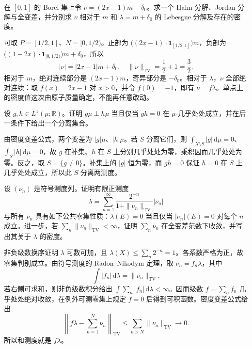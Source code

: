 \begin{exercise}\label{b1:ex:06-mixed-decompositions}
在 \([0,1]\) 的 Borel 集上令 \(\nu=(2x-1)m-\delta_0\)。求一个 Hahn 分解、Jordan 分解与全变差，并分别求 \(\nu\) 相对于 \(m\) 和 \(\lambda=m+\delta_0\) 的 Lebesgue 分解及存在的密度。
\end{exercise}
\begin{solution}
可取 \(P=[1/2,1]\)、\(N=[0,1/2)\)。正部为 \(\bigl((2x-1)\cdot\mathbf1_{[1/2,1]}\bigr)m\)，负部为 \(\bigl((1-2x)\cdot\mathbf1_{[0,1/2)}\bigr)m+\delta_0\)，所以
\[
|\nu|=|2x-1|m+\delta_0,\quad \|\nu\|_{\mathrm{TV}}=\frac12+1=\frac32.
\]
相对于 \(m\)，绝对连续部分是 \((2x-1)m\)，奇异部分是 \(-\delta_0\)。相对于 \(\lambda\)，\(\nu\) 全部绝对连续：取 \(f(x)=2x-1\) 对 \(x>0\)，并令 \(f(0)=-1\)，即有 \(\nu=f\lambda\)。单点上的密度值这次由原子质量确定，不能再任意改动。
\end{solution}

\begin{exercise}\label{b1:ex:06-density-singularity}
设 \(g,h\in L^1(\mu;\mathbb R)\)。证明 \(g\mu\perp h\mu\) 当且仅当 \(gh=0\) 在 \(\mu\)-几乎处处成立，并在后一条件下给出一个分离集合。
\end{exercise}
\begin{solution}
由密度变差公式，两个变差为 \(|g|\mu\)、\(|h|\mu\)。若 \(S\) 分离它们，则 \(\int_{X\setminus S}|g|\,\mathrm d\mu=0\)、\(\int_S|h|\,\mathrm d\mu=0\)，故 \(g\) 在补集、\(h\) 在 \(S\) 上分别几乎处处为零，乘积因而几乎处处为零。反之，取 \(S=\{g\neq0\}\)。补集上的 \(|g|\) 恒为零，而 \(gh=0\) 保证 \(h=0\) 在 \(S\) 上几乎处处成立，所以此 \(S\) 分离两测度。
\end{solution}

\begin{exercise}\label{b1:ex:06-common-control}
设 \((\nu_n)\) 是符号测度列。证明有限正测度
\[
\lambda=\sum_{n=1}^{\infty}\frac{2^{-n}}{1+\|\nu_n\|_{\mathrm{TV}}}|\nu_n|
\]
与所有 \(\nu_n\) 具有如下公共零集性质：\(\lambda(E)=0\) 当且仅当 \(|\nu_n|(E)=0\) 对每个 \(n\) 成立。进一步，若 \(\sum_n\|\nu_n\|_{\mathrm{TV}}<\infty\)，证明 \(\sum_n\nu_n\) 在全变差范数下收敛，并写出其关于 \(\lambda\) 的密度。
\end{exercise}
\begin{solution}
非负级数换序证明 \(\lambda\) 可数可加，且 \(\lambda(X)\leq\sum_n2^{-n}=1\)。各系数严格为正，故零集判别成立。由符号测度的 Radon--Nikodym 定理，取 \(\nu_n=f_n\lambda\)，其中
\[
\int|f_n|\,\mathrm d\lambda=\|\nu_n\|_{\mathrm{TV}}.
\]
若右侧可求和，则非负级数积分给出 \(\int\sum_n|f_n|\,\mathrm d\lambda<\infty\)。因而级数 \(f=\sum_nf_n\) 几乎处处绝对收敛，在例外可测零集上规定 \(f=0\) 后得到可积函数。密度变差公式给出
\[
\left\|f\lambda-\sum_{n=1}^{N}\nu_n\right\|_{\mathrm{TV}}
\leq\sum_{n>N}\|\nu_n\|_{\mathrm{TV}}\longrightarrow0.
\]
所以和测度就是 \(f\lambda\)。
\end{solution}

